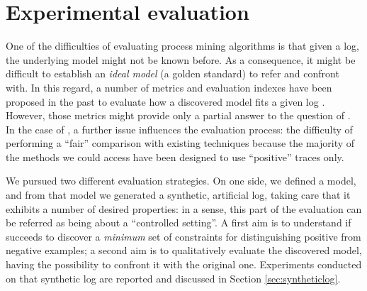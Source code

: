 
\newcommand{\todoinfc}[1]{\todo[inline,backgroundcolor=yellow]{FC: #1}}



\section{Experimental evaluation}
\label{sec:eval}


One of the difficulties of evaluating process mining algorithms is that given a log, the underlying model might not be known before. As a consequence, it might be difficult to establish an \emph{ideal model} (a golden standard) to refer and confront with. In this regard, a number of metrics and evaluation indexes have been proposed in the past to evaluate how a discovered model fits a given log \cite{2015-Adriansyah,2014-Broucke,2018-Ponce}. However, those metrics might provide only a partial answer to the question of . 
%
In the case of \nd, a further issue influences the evaluation process: the difficulty of performing a ``fair'' comparison with existing techniques because the majority of the methods we could access have been designed to use ``positive'' traces only.



We pursued two different evaluation strategies. On one side, we defined a model, and from that model we generated a synthetic, artificial log, taking care that it exhibits a number of desired properties: in a sense, this part of the evaluation can be referred as being about a ``controlled setting''. A first aim is to understand if \nd succeeds to discover a \emph{minimum} set of constraints for distinguishing positive from negative examples; a second aim is to qualitatively evaluate the discovered model, having the possibility to confront it with the original one. Experiments conducted on that synthetic log are reported and discussed in Section \ref{sec:syntheticlog}.

